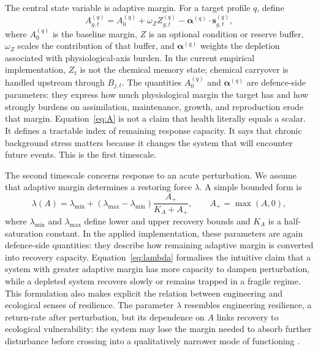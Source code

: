 The central state variable is adaptive margin. For a target profile $q$, define
\begin{equation}
  A^{(q)}_{g,t}
  = A^{(q)}_0 + \omega_Z Z^{(q)}_{g,t} - \bm{\alpha}^{(q)}\cdot \mathbf{s}^{(q)}_{g,t},
  \label{eq:A}
\end{equation}
where $A^{(q)}_0$ is the baseline margin, $Z$ is an optional condition or reserve buffer, $\omega_Z$ scales the contribution of that buffer, and $\bm{\alpha}^{(q)}$ weights the depletion associated with physiological-axis burden. In the current empirical implementation, $Z_t$ is not the chemical memory state; chemical carryover is handled upstream through $B_{j,t}$. The quantities $A_0^{(q)}$ and $\bm{\alpha}^{(q)}$ are defence-side parameters: they express how much physiological margin the target has and how strongly burdens on assimilation, maintenance, growth, and reproduction erode that margin. Equation~\eqref{eq:A} is not a claim that health literally equals a scalar. It defines a tractable index of remaining response capacity. It says that chronic background stress matters because it changes the system that will encounter future events. This is the first timescale.

The second timescale concerns response to an acute perturbation. We assume that adaptive margin determines a restoring force $\lambda$. A simple bounded form is
\begin{equation}
  \lambda(A) = \lambda_{\min} + (\lambda_{\max}-\lambda_{\min})\frac{A_+}{K_A + A_+},
  \qquad A_+ = \max(A,0),
  \label{eq:lambda}
\end{equation}
where $\lambda_{\min}$ and $\lambda_{\max}$ define lower and upper recovery bounds and $K_A$ is a half-saturation constant. In the applied implementation, these parameters are again defence-side quantities: they describe how remaining adaptive margin is converted into recovery capacity. Equation~\eqref{eq:lambda} formalises the intuitive claim that a system with greater adaptive margin has more capacity to dampen perturbation, while a depleted system recovers slowly or remains trapped in a fragile regime. This formulation also makes explicit the relation between engineering and ecological senses of resilience. The parameter $\lambda$ resembles engineering resilience, a return-rate after perturbation, but its dependence on $A$ links recovery to ecological vulnerability: the system may lose the margin needed to absorb further disturbance before crossing into a qualitatively narrower mode of functioning \citep{rapport1998ecosystem,scheffer2009early}.

